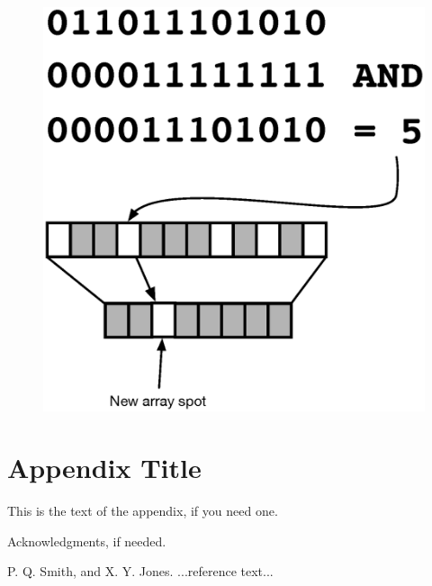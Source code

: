 \documentclass[preprint]{sigplanconf}
\begin{document}
\begin{figure}[H]
\includegraphics[scale=.5]{bitmask2}
\centering
\end{figure}

\appendix
\section{Appendix Title}

This is the text of the appendix, if you need one.

\acks

Acknowledgments, if needed.





\begin{thebibliography}{}
\softraggedright

P. Q. Smith, and X. Y. Jones. ...reference text...

\end{thebibliography}
\end{document}
